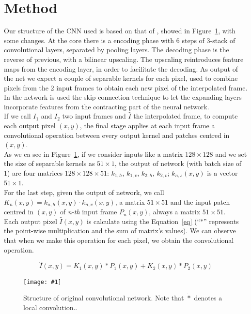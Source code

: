 \documentclass[11pt, a4paper]{article}
\newcommand{\image}[3]{
	\begin{figure}%
		\centering
		\texttt{[image: \#1]}
		\caption{#2.}
		\label{#3}
	\end{figure}
}
\begin{document}
	\section{Method} %
	Our structure of the CNN used is based on that of \cite{mainpaper}, showed in Figure~\ref{original-net}, with some changes. At the core there is a encoding phase with 6 steps of 3-stack of convolutional layers, separated by pooling layers. The decoding phase is the reverse of previous, with a bilinear upscaling. The upscaling reintroduces feature maps from the encoding layer, in order to facilitate the decoding. As output of the net we expect a couple of separable kernels for each pixel, used to combine pixels from the 2 input frames to obtain each new pixel of the interpolated frame. In the network is used the skip connection technique to let the expanding layers incorporate features from the contracting part of the neural network.\\
	If we call $I_1$ and $I_2$ two input frames and $\hat{I}$ the interpolated frame, to compute each output pixel $(x,y)$, the final stage applies at each input frame a convolutional operation between every output kernel and patches centred in $(x,y)$.\\
	As we ca see in Figure~\ref{original-net}, if we consider inputs like a matrix $128\times128$ and we set the size of separable kernels as $51\times1$, the output of network (with batch size of 1) are four matrices $128\times128\times51$: $k_{1,h}$, $k_{1,v}$, $k_{2,h}$, $k_{2,v}$; $k_{n,s}(x,y)$ is a vector $51\times1$.\\
	For the last step, given the output of network, we call $K_n(x,y) = k_{n,h}(x,y) \cdot k_{n,v}(x,y)$, a matrix $51\times51$ and the input patch centred in $(x,y)$ of \textit{n-th} input frame $P_n(x,y)$, always a matrix $51\times51$.\\
	Each output pixel $\hat{I}(x,y)$ is calculate using the Equation~\ref{eq} (``$*$'' represents the point-wise multiplication and the sum of matrix's values). We can observe that when we make this operation for each pixel, we obtain the convolutional operation. 
	
	\begin{equation}
		\hat{I}(x,y) = K_1(x,y) * P_1(x,y) + K_2(x,y) * P_2(x,y)
		\label{eq}
	\end{equation}
	
	\image{net_structure}{Structure of original convolutional network. Note that $\dot{*}$ denotes a local convolution.}{original-net}
\end{document}
